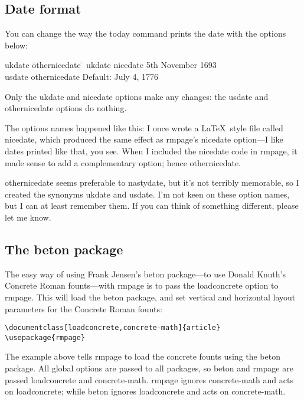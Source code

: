 \documentclass[11pt,loose,twoside,touchwider,longish,
                      noheaders,a4paper,notstdmargins]{report}
\newcommand*{\packname}[1]{{\sffamily #1}}
\DeclareRobustCommand*{\comname}[1]{{\ttfamily\makeatletter\bs #1\makeatother}}
\newcommand*{\classname}[1]{{\ttfamily #1}}
\newcommand*{\optname}[1]{{\ttfamily #1}}
\newcommand*{\rmpage}{\classname{rmpage}\xspace}
\begin{document}
\subsection{Date format}
\label{use:dateformat}

You can change the way the \comname{today} command prints the date
with the options below:
\begin{tabbing}
\optname{ukdate} \= \optname{othernicedate} \= \kill
\optname{ukdate} \> \optname{nicedate} \> 5th November 1693\\
\optname{usdate} \> \optname{othernicedate} \> Default: July 4, 1776
\end{tabbing}
Only the \optname{ukdate} and \optname{nicedate} options make any
changes: the \optname{usdate} and \optname{othernicedate} options do
nothing.

The options names happened like this: I once wrote a \LaTeX\ style
file called \packname{nicedate}, which produced the same effect as
\rmpage's \optname{nicedate} option---I like dates printed like that,
you see.  When I included the \packname{nicedate} code in \rmpage, it
made sense to add a complementary option; hence \optname{othernicedate}.

\optname{othernicedate} seems preferable to \optname{nastydate}, but
it's not terribly memorable, so I created the synonyms
\optname{ukdate} and \optname{usdate}.  I'm not keen on these option
names, but I can at least remember them.  If you can think of
something different, please let me know.

\subsection{The \packname{beton} package}
\label{use:beton}

The easy way of using Frank Jensen's \packname{beton} package---to use
Donald Knuth's Concrete Roman founts---with \rmpage is to pass the
\optname{loadconcrete} option to \rmpage.  This will load the
\packname{beton} package, and set vertical and horizontal layout
parameters for the Concrete Roman founts:
\begin{verbatim}
\documentclass[loadconcrete,concrete-math]{article}
\usepackage{rmpage}
\end{verbatim}
The example above tells \rmpage to load the concrete founts using the
\packname{beton} package.  All global options are passed to all
packages, so \packname{beton} and \rmpage are passed
\optname{loadconcrete} and \optname{concrete-math}.  \rmpage ignores
\optname{concrete-math} and acts on \optname{loadconcrete}; while
\packname{beton} ignores \optname{loadconcrete} and acts on
\optname{concrete-math}.
\end{document}
